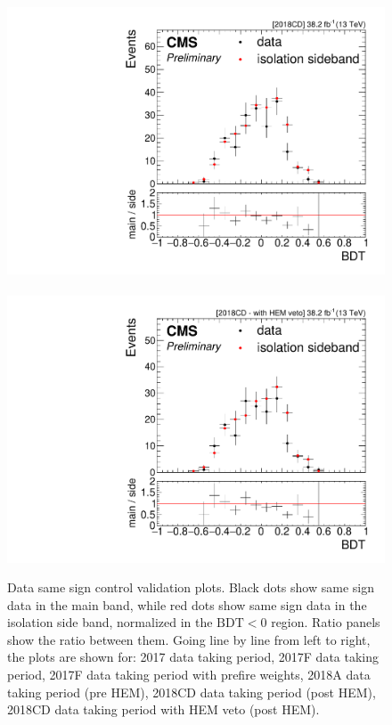 \begin{figure}[!htb]
\includegraphics[width=0.48\linewidth]{plots/dilepton_muons_data_isocr_no_retag_CorrJetNoMultIso10_06_invmass_same_sign_2018CD/none_dilepBDTCorrJetNoMultIso10Dr0.6.pdf} \,
\includegraphics[width=0.48\linewidth]{plots/dilepton_muons_data_isocr_no_retag_CorrJetNoMultIso10_06_invmass_same_sign_2018CD_hem_veto/hem_ejm_dilepBDTCorrJetNoMultIso10Dr0.6.pdf} \\

\caption[Data same sign control validation plots]{Data same sign control validation plots. Black dots show same sign data in the main band, while red dots show same sign data in the isolation side band, normalized in the $\text{BDT}<0$ region. Ratio panels show the ratio between them. Going line by line from left to right, the plots are shown for: 2017 data taking period, 2017F data taking period, 2017F data taking period with prefire weights, 2018A data taking period (pre HEM), 2018CD data taking period (post HEM), 2018CD data taking period with HEM veto (post HEM).}
\label{fig:same-sign-validation-plots}
\end{figure}